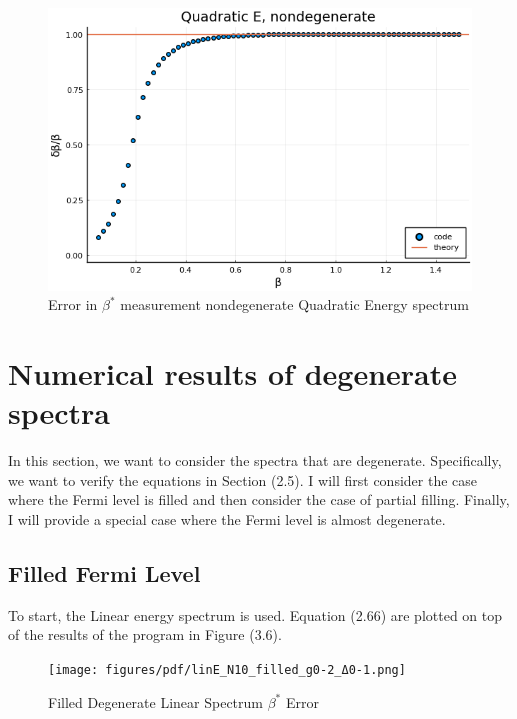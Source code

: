 \begin{figure}[H]
    \centering
    \includegraphics[scale=0.75]{figures/pdf/quadEnondeg.png}
    \caption{Error in $\beta^*$ measurement nondegenerate Quadratic Energy spectrum}
\end{figure}


\section{Numerical results of degenerate spectra}
In this section, we want to consider the spectra that are degenerate. Specifically, we want to verify the equations in Section (2.5). I will first consider the case where the Fermi level is filled and then consider the case of partial filling. Finally, I will provide a special case where the Fermi level is almost degenerate. 
\subsection{Filled Fermi Level}
To start, the Linear energy spectrum is used. Equation (2.66) are plotted on top of the results of the program in Figure (3.6).  

\begin{figure}[H]
    \centering
    \texttt{[image: figures/pdf/linE\_N10\_filled\_g0-2\_Δ0-1.png]}
    \caption{Filled Degenerate Linear Spectrum $\beta^*$ Error}
    \label{fig:Filled}
\end{figure}

